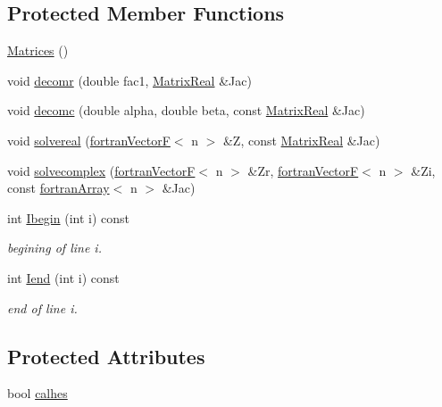 \subsection*{Protected Member Functions}
\begin{DoxyCompactItemize}
\item 
\hyperlink{classodes_1_1Matrices_a8fd82bde4e3a427a677e850ecc0fbeac}{Matrices} ()
\item 
void \hyperlink{classodes_1_1Matrices_a8dc1bc6d92d06af08d4bf8fb2b357a7d}{decomr} (double fac1, \hyperlink{classodes_1_1Matrices_aa028f1e52916558a51d333ac8b081030}{Matrix\+Real} \&Jac)
\item 
void \hyperlink{classodes_1_1Matrices_a9f497885fb6dd9bb22179fab49d9b587}{decomc} (double alpha, double beta, const \hyperlink{classodes_1_1Matrices_aa028f1e52916558a51d333ac8b081030}{Matrix\+Real} \&Jac)
\item 
void \hyperlink{classodes_1_1Matrices_ace113b7bfa2377d513c2faaf645aecaa}{solvereal} (\hyperlink{classodes_1_1fortranVectorF}{fortran\+Vector\+F}$<$ n $>$ \&Z, const \hyperlink{classodes_1_1Matrices_aa028f1e52916558a51d333ac8b081030}{Matrix\+Real} \&Jac)
\item 
void \hyperlink{classodes_1_1Matrices_abce8558c305de75740568ec55e49338e}{solvecomplex} (\hyperlink{classodes_1_1fortranVectorF}{fortran\+Vector\+F}$<$ n $>$ \&Zr, \hyperlink{classodes_1_1fortranVectorF}{fortran\+Vector\+F}$<$ n $>$ \&Zi, const \hyperlink{classodes_1_1fortranArray}{fortran\+Array}$<$ n $>$ \&Jac)
\item 
int \hyperlink{classodes_1_1Matrices_a9eb26d713d3e391f60d83798337d87a6}{Ibegin} (int i) const 
\begin{DoxyCompactList}\small\item\em begining of line i. \end{DoxyCompactList}\item 
int \hyperlink{classodes_1_1Matrices_a589402cfa0e11666cd152a06e048c6f7}{Iend} (int i) const 
\begin{DoxyCompactList}\small\item\em end of line i. \end{DoxyCompactList}\end{DoxyCompactItemize}
\subsection*{Protected Attributes}
\begin{DoxyCompactItemize}
\item 
bool \hyperlink{classodes_1_1Matrices_a82e935680c27f58bcff8a559700411c6}{calhes}
\end{DoxyCompactItemize}
